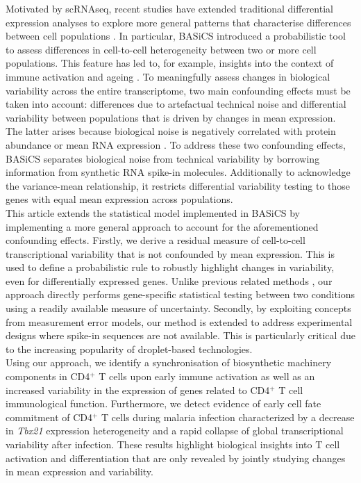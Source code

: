 Motivated by scRNAseq, recent studies have extended traditional differential expression analyses to explore more general patterns that characterise differences between cell populations \citep[e.g.~][]{Korthauer2016}. In particular, BASiCS \citep{Vallejos2015BASiCS,Vallejos2016} introduced a probabilistic tool to assess differences in cell-to-cell heterogeneity between two or more cell populations. This feature has led to, for example, insights into the context of immune activation and ageing \citep{Martinez-jimenez2017}. To meaningfully assess changes in biological variability across the entire transcriptome, two main confounding effects must be taken into account: differences due to artefactual technical noise and differential variability between populations that is driven by changes in mean expression. The latter arises because biological noise is negatively correlated with protein abundance \citep{Bar-Even2006, Newman2006, Taniguchi2011} or mean RNA expression \citep{Brennecke2013, Antolovic2017}. To address these two confounding effects, BASiCS separates biological noise from technical variability  by borrowing information from synthetic RNA spike-in molecules. Additionally to acknowledge the variance-mean relationship, it restricts differential variability testing to those genes with equal mean expression across populations. \\

This article extends the statistical model implemented in BASiCS by implementing a more general approach to account for the aforementioned confounding effects. Firstly, we derive a residual measure of cell-to-cell transcriptional variability that is not confounded by mean expression. This is used to define a probabilistic rule to robustly highlight changes in variability, even for differentially expressed genes. Unlike previous related methods \citep[e.g.~][]{Kolodziejczyk2015cell}, our approach directly performs gene-specific statistical testing between two conditions using a readily available measure of uncertainty. Secondly, by exploiting concepts from measurement error models, our method is extended to address experimental designs where spike-in sequences are not available. This is particularly critical due to the increasing popularity of droplet-based technologies. \\

Using our approach, we identify a synchronisation of  biosynthetic machinery components in CD4$^+$ T cells upon early immune activation as well as an increased variability in the expression of genes related to CD4$^+$ T cell immunological function.
Furthermore, we detect evidence of early cell fate commitment of CD4$^+$ T cells during malaria infection characterized by a decrease in \textit{Tbx21} expression heterogeneity and a rapid collapse of global transcriptional variability after infection. These results highlight biological insights into T cell activation and differentiation that are only revealed by jointly studying changes in mean expression and variability.
